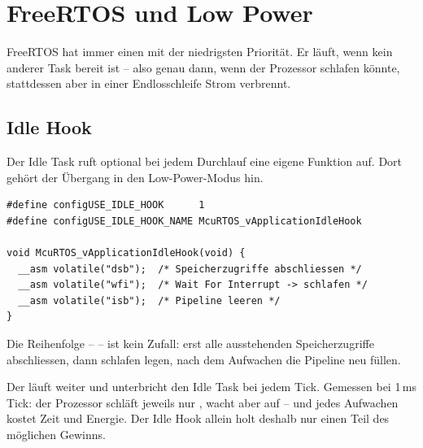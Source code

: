 \section{FreeRTOS und Low Power}
\label{sec:rtospwr}

 FreeRTOS hat immer einen  mit der
niedrigsten Priorität. Er läuft, wenn kein anderer Task bereit ist --
also genau dann, wenn der Prozessor schlafen könnte, stattdessen aber in
einer Endlosschleife Strom verbrennt.

\subsection{Idle Hook}
\label{rez:idlehook}
Der Idle Task ruft optional bei jedem Durchlauf eine eigene Funktion auf.
Dort gehört der Übergang in den Low-Power-Modus hin.
\begin{lstlisting}
#define configUSE_IDLE_HOOK      1
#define configUSE_IDLE_HOOK_NAME McuRTOS_vApplicationIdleHook

void McuRTOS_vApplicationIdleHook(void) {
  __asm volatile("dsb");  /* Speicherzugriffe abschliessen */
  __asm volatile("wfi");  /* Wait For Interrupt -> schlafen */
  __asm volatile("isb");  /* Pipeline leeren */
}
\end{lstlisting}
\merkzeile Die Reihenfolge  --  --  ist kein
Zufall: erst alle ausstehenden Speicherzugriffe abschliessen, dann
schlafen legen, nach dem Aufwachen die Pipeline neu füllen.

\begin{falle}
Der  läuft weiter und unterbricht den Idle Task bei jedem
Tick. Gemessen bei 1\,ms Tick: der Prozessor schläft jeweils nur
, wacht aber  auf -- und jedes
Aufwachen kostet Zeit und Energie. Der Idle Hook allein holt deshalb nur
einen Teil des möglichen Gewinns.
\end{falle}

